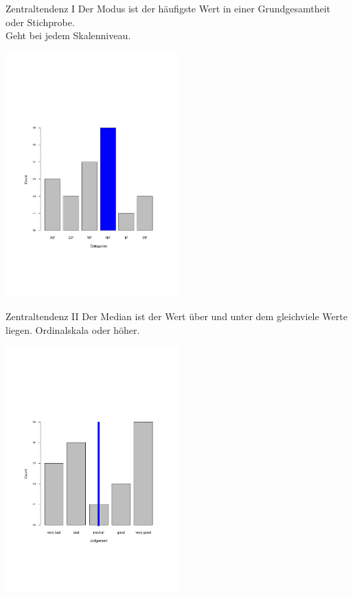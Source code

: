 \begin{frame}
  {Zentraltendenz I}
  Der \alert{Modus} ist der \alert{häufigste Wert} in einer Grundgesamtheit oder Stichprobe.\\
  \alert{Geht bei jedem Skalenniveau.}
  \vspace{-2cm}
  \begin{center}
    \includegraphics[width=0.5\textwidth]{graphics/mode}
  \end{center}
\end{frame}

\begin{frame}
  {Zentraltendenz II}
  Der \alert{Median} ist der Wert \alert{über und unter dem gleichviele Werte} liegen. \alert{Ordinalskala oder höher.}
  \vspace{-2cm}
  \begin{center}
    \includegraphics[width=0.5\textwidth]{graphics/median}
  \end{center}
\end{frame}


